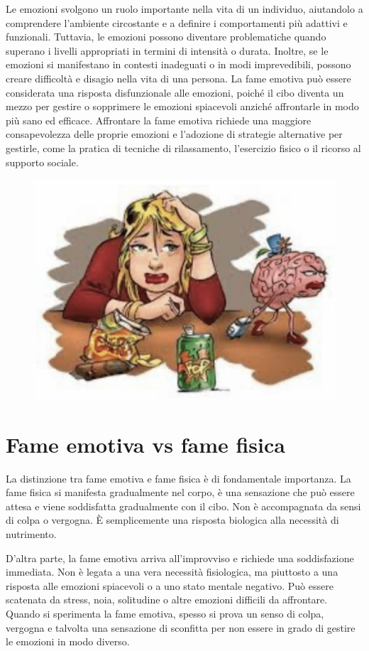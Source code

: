 \documentclass[12pt,oneside,a4paper]{article}
\begin{document}
Le emozioni svolgono un ruolo importante nella vita di un individuo, aiutandolo a comprendere l'ambiente circostante e a definire i comportamenti più adattivi e funzionali. Tuttavia, le emozioni possono diventare problematiche quando superano i livelli appropriati in termini di intensità o durata. Inoltre, se le emozioni si manifestano in contesti inadeguati o in modi imprevedibili, possono creare difficoltà e disagio nella vita di una persona. La fame emotiva può essere considerata una risposta disfunzionale alle emozioni, poiché il cibo diventa un mezzo per gestire o sopprimere le emozioni spiacevoli anziché affrontarle in modo più sano ed efficace. Affrontare la fame emotiva richiede una maggiore consapevolezza delle proprie emozioni e l'adozione di strategie alternative per gestirle, come la pratica di tecniche di rilassamento, l'esercizio fisico o il ricorso al supporto sociale. 
\begin{figure}[h]
    \centering
    \includegraphics[width=.7\textwidth]{fame.png}
    \label{fig:my_label}
\end{figure}

\section{Fame emotiva vs fame fisica } \label{sec:emfis}
La distinzione tra fame emotiva e fame fisica è di fondamentale importanza. La fame fisica si manifesta gradualmente nel corpo, è una sensazione che può essere attesa e viene soddisfatta gradualmente con il cibo. Non è accompagnata da sensi di colpa o vergogna. È semplicemente una risposta biologica alla necessità di nutrimento. 

D'altra parte, la fame emotiva arriva all'improvviso e richiede una soddisfazione immediata. Non è legata a una vera necessità fisiologica, ma piuttosto a una risposta alle emozioni spiacevoli o a uno stato mentale negativo. Può essere scatenata da stress, noia, solitudine o altre emozioni difficili da affrontare. Quando si sperimenta la fame emotiva, spesso si prova un senso di colpa, vergogna e talvolta una sensazione di sconfitta per non essere in grado di gestire le emozioni in modo diverso. 
\end{document}
